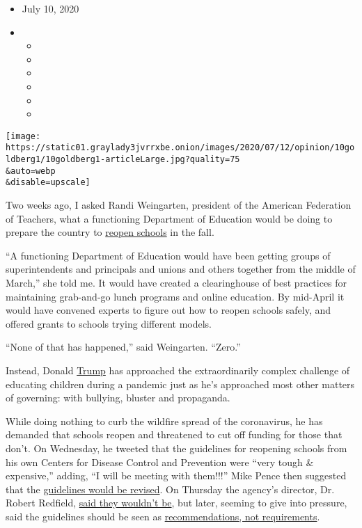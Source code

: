 \begin{itemize}
\item
  July 10, 2020
\item
  \begin{itemize}
  \item
  \item
  \item
  \item
  \item
  \item
  \end{itemize}
\end{itemize}

\texttt{[image: https://static01.graylady3jvrrxbe.onion/images/2020/07/12/opinion/10goldberg1/10goldberg1-articleLarge.jpg?quality=75\\\&auto=webp\\\&disable=upscale]}

Two weeks ago, I asked Randi Weingarten, president of the American
Federation of Teachers, what a functioning Department of Education would
be doing to prepare the country to
\href{https://www.nytimes3xbfgragh.onion/2020/07/10/us/politics/trump-schools-reopening.html}{reopen
schools} in the fall.

``A functioning Department of Education would have been getting groups
of superintendents and principals and unions and others together from
the middle of March,'' she told me. It would have created a
clearinghouse of best practices for maintaining grab-and-go lunch
programs and online education. By mid-April it would have convened
experts to figure out how to reopen schools safely, and offered grants
to schools trying different models.

``None of that has happened,'' said Weingarten. ``Zero.''

Instead, Donald
\href{https://www.nytimes3xbfgragh.onion/2020/07/10/us/politics/trump-schools-reopening.html}{Trump}
has approached the extraordinarily complex challenge of educating
children during a pandemic just as he's approached most other matters of
governing: with bullying, bluster and propaganda.

While doing nothing to curb the wildfire spread of the coronavirus, he
has demanded that schools reopen and threatened to cut off funding for
those that don't. On Wednesday, he tweeted that the guidelines for
reopening schools from his own Centers for Disease Control and
Prevention were ``very tough \& expensive,'' adding, ``I will be meeting
with them!!!'' Mike Pence then suggested that the
\href{https://www.usatoday.com/story/news/politics/2020/07/08/pence-cdc-changing-coronavirus-school-guidelines-after-trump-attack/5398493002/}{guidelines
would be revised}. On Thursday the agency's director, Dr. Robert
Redfield,
\href{https://www.cnn.com/2020/07/09/politics/cdc-guidelines-school-reopenings/index.html}{said
they wouldn't be}, but later, seeming to give into pressure, said the
guidelines should be seen as
\href{https://news.yahoo.com/cdc-softens-guidelines-for-reopening-schools-after-trump-calls-them-impractical-and-expensive-181630718.html}{recommendations,
not requirements}.

